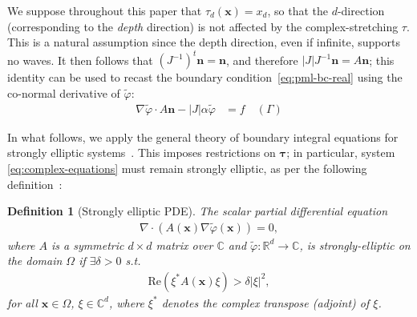 \documentclass[11pt]{article}
\newcommand{\R}{\mathbb{R}}
\newcommand{\C}{\mathbb{C}}
\newcommand{\bn}{\mathbf{n}}
\newcommand{\bx}{\mathbf{x}}
\newcommand{\btau}{\mathbf{\tau}}
\newcommand{\tvarphi}{\tilde \varphi}
\newtheorem{definition}[theorem]{Definition}
\begin{document}
We suppose throughout this paper that $\tau_d(\bx) = x_d$, so that the
$d$-direction (corresponding to the \emph{depth} direction) is not affected by
the complex-stretching $\tau$. This is a natural assumption since the depth
direction, even if infinite, supports no waves. It then follows that $(J^{-1})^t
\bn = \bn$, and therefore $|J| J^{-1} \bn = A \bn$; this identity can be used to
recast the boundary condition~\cref{eq:pml-bc-real} using the co-normal
derivative of $\tvarphi$:
\begin{align}
  \label{eq:pml-bc-real-2}
  \nabla \tvarphi \cdot A\bn - |J| \alpha \tvarphi &= f \quad (\Gamma)
\end{align}

In what follows, we apply the general theory of boundary integral equations for
strongly elliptic systems~\cite{mclean2000strongly}. This imposes restrictions
on $\btau$; in particular, system \cref{eq:complex-equations} must remain
strongly elliptic, as per the following definition~\cite[equation
4.7]{mclean2000strongly}:
\begin{definition}[Strongly elliptic PDE]
  The scalar partial differential equation
  \begin{align}
    \nabla \cdot \left( A(\bx) \nabla \tvarphi(\bx) \right) = 0,
  \end{align}
  where $A$ is a symmetric $d \times d$ matrix over $\mathbb{C}$ and
  $\tvarphi : \R^d \to \C$, is strongly-elliptic on the domain $\Omega$
  if $\exists \delta > 0$ s.t.
  \begin{align}
    \mathrm{Re}\left( \xi^* A(\bx) \xi \right) > \delta |\xi|^2,
  \end{align}
  for all $\bx \in \Omega$, $\xi \in \C^{d}$, where $\xi^*$ denotes the complex
  transpose (adjoint) of $\xi$.
\end{definition}
\end{document}
